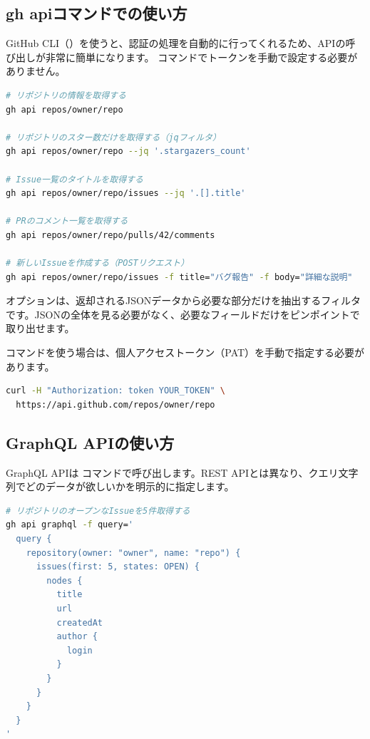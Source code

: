 \subsection{gh apiコマンドでの使い方}

GitHub CLI（）を使うと、認証の処理を自動的に行ってくれるため、APIの呼び出しが非常に簡単になります。 コマンドでトークンを手動で設定する必要がありません。

\begin{lstlisting}[language=bash]
# リポジトリの情報を取得する
gh api repos/owner/repo

# リポジトリのスター数だけを取得する（jqフィルタ）
gh api repos/owner/repo --jq '.stargazers_count'

# Issue一覧のタイトルを取得する
gh api repos/owner/repo/issues --jq '.[].title'

# PRのコメント一覧を取得する
gh api repos/owner/repo/pulls/42/comments

# 新しいIssueを作成する（POSTリクエスト）
gh api repos/owner/repo/issues -f title="バグ報告" -f body="詳細な説明"
\end{lstlisting}

 オプションは、返却されるJSONデータから必要な部分だけを抽出するフィルタです。JSONの全体を見る必要がなく、必要なフィールドだけをピンポイントで取り出せます。

 コマンドを使う場合は、個人アクセストークン（PAT）を手動で指定する必要があります。

\begin{lstlisting}[language=bash]
curl -H "Authorization: token YOUR_TOKEN" \
  https://api.github.com/repos/owner/repo
\end{lstlisting}

\subsection{GraphQL APIの使い方}

GraphQL APIは  コマンドで呼び出します。REST APIとは異なり、クエリ文字列でどのデータが欲しいかを明示的に指定します。

\begin{lstlisting}[language=bash]
# リポジトリのオープンなIssueを5件取得する
gh api graphql -f query='
  query {
    repository(owner: "owner", name: "repo") {
      issues(first: 5, states: OPEN) {
        nodes {
          title
          url
          createdAt
          author {
            login
          }
        }
      }
    }
  }
'
\end{lstlisting}

